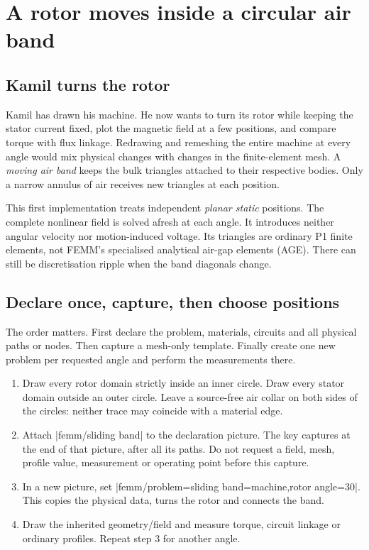 \section{A rotor moves inside a circular air band}
\label{sec:sliding}

\subsection{Kamil turns the rotor}
Kamil has drawn his machine. He now wants to turn its rotor while keeping the
stator current fixed, plot the magnetic field at a few positions, and compare
torque with flux linkage. Redrawing and remeshing the entire machine at every
angle would mix physical changes with changes in the finite-element mesh.
A \emph{moving air band} keeps the bulk triangles attached to their respective
bodies. Only a narrow annulus of air receives new triangles at each position.

This first implementation treats independent \emph{planar static} positions.
The complete nonlinear field is solved afresh at each angle. It introduces
neither angular velocity nor motion-induced voltage. Its triangles are ordinary
P1 finite elements, not FEMM's specialised analytical air-gap elements (AGE).
There can still be discretisation ripple when the band diagonals change.

\subsection{Declare once, capture, then choose positions}
The order matters. First declare the problem, materials, circuits and all
physical paths or nodes. Then capture a mesh-only template. Finally create
one new problem per requested angle and perform the measurements there.
\begin{enumerate}
\item Draw every rotor domain strictly inside an inner circle. Draw every
  stator domain outside an outer circle. Leave a source-free air collar on
  both sides of the circles: neither trace may coincide with a material edge.
\item Attach |femm/sliding band| to the declaration picture. The key captures
  at the end of that picture, after all its paths. Do not request a field,
  mesh, profile value, measurement or operating point before this capture.
\item In a new picture, set |femm/problem={sliding band=machine,rotor angle=30}|.
  This copies the physical data, turns the rotor and connects the band.
\item Draw the inherited geometry/field and measure torque, circuit linkage
  or ordinary profiles. Repeat step 3 for another angle.
\end{enumerate}

